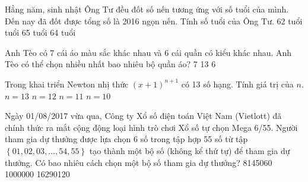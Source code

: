 \begin{ex}%
Hằng năm, sinh nhật Ông Tư đều đốt số nến tương ứng với số tuổi của mình. Đến nay đã đốt được tổng số là 2016 ngọn nến. Tính số tuổi của Ông Tư.
\choice
{62 tuổi}
{ tuổi}
{65 tuổi}
{64 tuổi}
\end{ex}
\begin{ex}%
Anh Tèo có 7 cái áo màu sắc khác nhau và 6 cái quần có kiểu khác nhau. Anh Tèo có thể chọn nhiều nhất bao nhiêu bộ quần áo?
\choice
{7}
{13}
{6}
{}
\end{ex}
\begin{ex}%
Trong khai triển Newton nhị thức $(x+1)^{n+1}$ có 13 số hạng. Tính giá trị của $n$.
\choice
{$n=13$}
{$n=12$}
{\True $n=11$}
{$n=10$}
\end{ex}
\begin{ex}%
Ngày 01/08/2017 vừa qua, Công ty Xổ số điện toán Việt Nam (Vietlott) đã chính thức ra mắt cộng động loại hình trò chơi Xổ số tự chọn Mega 6/55. Người tham gia dự thưởng được lựa chọn 6 số trong tập hợp 55 số từ tập $\left\{01,02,03,\ldots ,54,55\right\}$ tạo thành một bộ số (không kể thứ tự) để tham gia dự thưởng. Có bao nhiêu cách chọn một bộ số tham gia dự thưởng?
\choice
{8145060}
{1000000}
{}
{16290120}
\end{ex}
